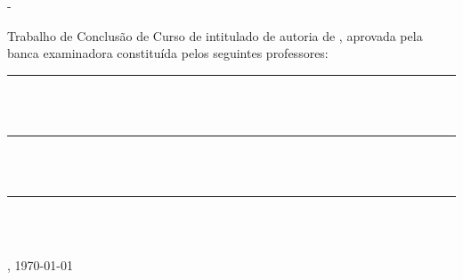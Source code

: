 

% 


\begin{folhadeaprovacao}

\begin{center}
\sigladep \hspace{2mm}- \dep \\
\instituto
\end{center}

\vspace{0.2in}

Trabalho de Conclusão de Curso de \nomedocurso \hspace*{0.1mm} intitulado \textit{\textbf{\em \thetitle}} de autoria de \theauthor, 
aprovada pela banca examinadora constituída pelos seguintes professores: 

\vspace{1in}

\begin{center}
 \begin{minipage}{0.6\textwidth}
  \hrule \vspace{0.05in}
  \orientador \\
  \genorientador\\
 \end{minipage}
  
  \vspace{1in}
 \begin{minipage}{0.6\textwidth}
  \hrule \vspace{0.05in}
  \profb\\
  \instprofb\\
 \end{minipage}
 
 \vspace{1in}
 \begin{minipage}{0.6\textwidth}
  \hrule \vspace{0.05in}
  \profc\\
  \instprofc\\
 \end{minipage}
\end{center}

\vfill

\begin{center}
\cidade, \today
\end{center}

\vspace{0.05in}

\newpage
\end{folhadeaprovacao}